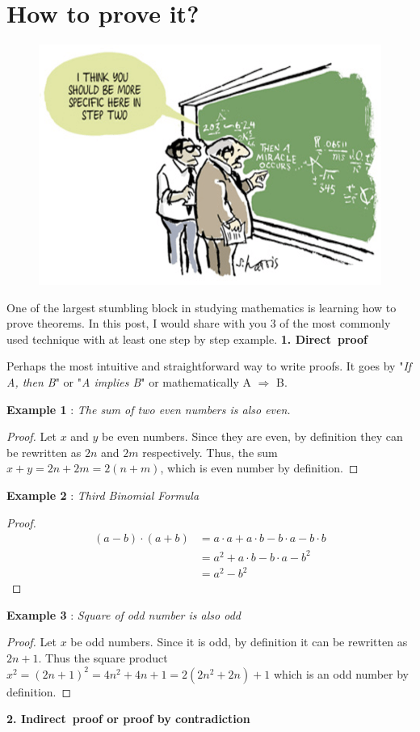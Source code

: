 \chapter{How to prove it?}
\begin{figure}[htp]
	\centering
	\includegraphics[width=\linewidth]{Assets/0_W-tEtGVYH9eM9HNx}
	\caption{}
	\label{fig:specific}
\end{figure}

\noindent One of the largest stumbling block in studying mathematics is learning how to prove theorems. In this post, I would share with you 3 of the most commonly used technique with at least one step by step example.
\newpage
\noindent \textbf{1. Direct proof}

\noindent Perhaps the most intuitive and straightforward way to write proofs. It goes by "\textit{If A, then B}" or  "\textit{A implies B}" or mathematically A $\Rightarrow$ B.

\noindent\textbf{Example 1} : \textit{The sum of two even numbers is also even.}
\begin{proof}
	Let $x$ and $y$ be even numbers. Since they are even, by definition they can be rewritten as $2n$ and $2m$ respectively. Thus, the sum $x+y = 2n+2m = 2(n+m)$, which is even number by definition.
\end{proof}
\noindent\textbf{Example 2} : \textit{Third Binomial Formula}
\begin{proof}
\begin{align}
(a-b)\cdot (a+b)&= a\cdot a+a\cdot b-b \cdot a-b \cdot b\\ 
			&= a^2+a \cdot b-b \cdot a-b^2\\ 
			&= a^2-b^2 
\end{align}
\end{proof}
\noindent\textbf{Example 3} : \textit{Square of odd number is also odd}
\begin{proof}
Let $x$ be odd numbers. Since it is odd, by definition it can be rewritten as $2n+1$. Thus the square product $x^2 = (2n+1)^2 = 4n^2+4n+1 = 2(2n^2+2n)+1$ which is an odd number by definition.
\end{proof}
\noindent \textbf{2. Indirect proof or proof by contradiction}

